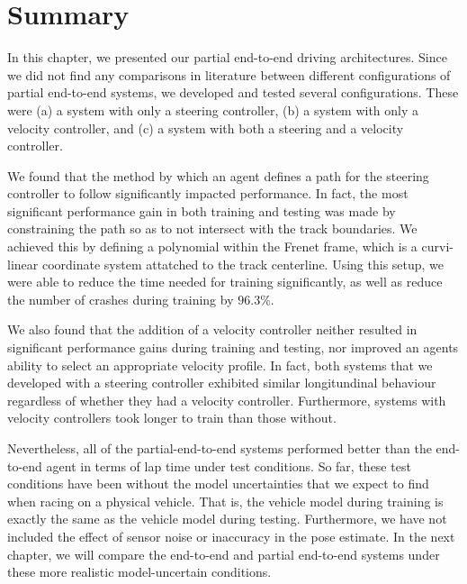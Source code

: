 

\section{Summary}
In this chapter, we presented our partial end-to-end driving architectures.
Since we did not find any comparisons in literature between different configurations of partial end-to-end systems, we developed and tested several configurations.
These were (a) a system with only a steering controller, (b) a system with only a velocity controller, and (c) a system with both a steering and a velocity controller.

We found that the method by which an agent defines a path for the steering controller to follow significantly impacted performance.
In fact, the most significant performance gain in both training and testing was made by constraining the path so as to not intersect with the track boundaries.
We achieved this by defining a polynomial within the Frenet frame, which is a curvi-linear coordinate system attatched to the track centerline.
Using this setup, we were able to reduce the time needed for training significantly, as well as reduce the number of crashes during training by $96.3\%$.

We also found that the addition of a velocity controller neither resulted in significant performance gains during training and testing, nor improved an agents ability to select an appropriate velocity profile.
In fact, both systems that we developed with a steering controller exhibited similar longitundinal behaviour regardless of whether they had a velocity controller. 
Furthermore, systems with velocity controllers took longer to train than those without.

Nevertheless, all of the partial-end-to-end systems performed better than the end-to-end agent in terms of lap time under test conditions.
So far, these test conditions have been without the model uncertainties that we expect to find when racing on a physical vehicle.
That is, the vehicle model during training is exactly the same as the vehicle model during testing.
Furthermore, we have not included the effect of sensor noise or inaccuracy in the pose estimate.
In the next chapter, we will compare the end-to-end and partial end-to-end systems under these more realistic model-uncertain conditions.

